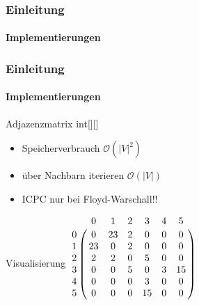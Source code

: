 \begin{frame}
    \frametitle{Einleitung}
    \framesubtitle{Implementierungen}
\end{frame}

\begin{frame}
    \frametitle{Einleitung}
    \framesubtitle{Implementierungen}
    \begin{KITexampleblock}{Adjazenzmatrix}
    int[][]
    \begin{itemize}
        \item Speicherverbrauch \( \mathcal{O}(|V|^2)\)
        \item über Nachbarn iterieren \( \mathcal{O}(|V|)\)
        \item ICPC nur bei Floyd-Warschall!!
    \end{itemize}
    \end{KITexampleblock}
    \vspace{0.001em}
    \begin{KITinfoblock}{Visualisierung}
        $\bordermatrix{
  & 0  & 1  & 2  & 3  & 4  & 5  \cr
0 & 0  & 23 & 2  & 0  & 0  & 0  \cr
1 & 23 & 0  & 2  & 0  & 0  & 0  \cr
2 & 2  & 2  & 0  & 5  & 0  & 0  \cr
3 & 0  & 0  & 5  & 0  & 3  & 15 \cr
4 & 0  & 0  & 0  & 3  & 0  & 0  \cr
5 & 0  & 0  & 0  & 15 & 0  & 0  \cr
} $ %
    \end{KITinfoblock}
\end{frame}

